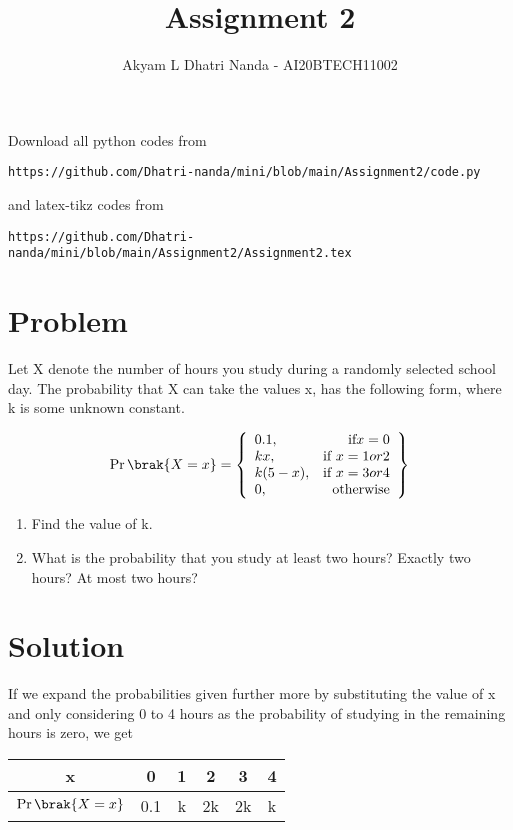 \documentclass[journal,12pt,twocolumn]{IEEEtran}
\begin{document}
     \def\rightbox#1{\makebox[0in][r]{#1}}
     \def\centbox#1{\makebox[0in]{#1}}
     \def\topbox#1{\raisebox{-\baselineskip}[0in][0in]{#1}}
     \def\midbox#1{\raisebox{-0.5\baselineskip}[0in][0in]{#1}}
\vspace{3cm}
\title{Assignment 2}
\author{Akyam L Dhatri Nanda - AI20BTECH11002}
\maketitle
\newpage
\bigskip
\renewcommand{\thefigure}{\theenumi}
\renewcommand{\thetable}{\theenumi}
Download all python codes from 
\begin{lstlisting}
https://github.com/Dhatri-nanda/mini/blob/main/Assignment2/code.py
\end{lstlisting}
%
and latex-tikz codes from 
%
\begin{lstlisting}
https://github.com/Dhatri-nanda/mini/blob/main/Assignment2/Assignment2.tex
\end{lstlisting}
\section{Problem}
Let X denote the number of hours you study during a randomly selected school day. The probability that X can take the values x, has the following form, where k is some unknown constant.

\[
    \Pr\brak{X = x} = \left\{\begin{array}{lr}
        0.1, &\text{if} x = 0\\
        kx, & \text{if } x = 1 or 2\\
        k(5-x), & \text{if } x = 3 or 4\\
        0, & \text{otherwise}
        \end{array}\right\}
  \]
  
  \begin{enumerate}[label={\Alph*)}]
   \item Find the value of k.
   \item What is the probability that you study at least two hours? Exactly two hours? At most two hours?
  \end{enumerate}
  
  \section{Solution}
  
  If we expand the probabilities given further more by substituting the value of x and only considering 0 to 4 hours as the probability of studying in the remaining hours is zero, we get\vspace{3mm}
 \begin{center}
  
  \begin{tabular}{|c|c|c|c|c|c|}
    \hline
    x &  0 & 1 & 2 & 3 & 4\\
    \hline
    $\Pr\brak{X=x}$ & 0.1& k& 2k & 2k & k\\
    \hline
    
\end{tabular}
\end{center}
\end{document}
